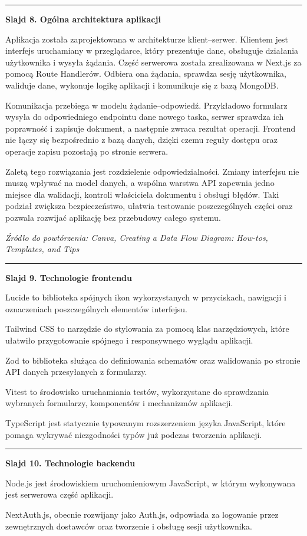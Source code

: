 \documentclass[12pt,a4paper]{article}
\newif\iffirstslide
\newcommand{\Slide}[2]{%
  \iffirstslide
    \global\firstslidefalse
  \else
    \par\vspace{1.5\baselineskip}%
    \noindent\rule{\textwidth}{0.8pt}%
    \par\vspace{1.5\baselineskip}%
  \fi
  {\LARGE\bfseries Slajd #1. #2\par}%
  \vspace{2\baselineskip}%
}
\newcommand{\Source}[1]{%
  \par\vspace{0.5\baselineskip}%
  {\small\itshape Źródło do powtórzenia: #1\par}%
}
\begin{document}
\Slide{8}{Ogólna architektura aplikacji}

Aplikacja została zaprojektowana w architekturze klient--serwer. Klientem jest interfejs uruchamiany w przeglądarce, który prezentuje dane, obsługuje działania użytkownika i wysyła żądania. Część serwerowa została zrealizowana w Next.js za pomocą Route Handlerów. Odbiera ona żądania, sprawdza sesję użytkownika, waliduje dane, wykonuje logikę aplikacji i komunikuje się z bazą MongoDB.

Komunikacja przebiega w modelu żądanie--odpowiedź. Przykładowo formularz wysyła do odpowiedniego endpointu dane nowego taska, serwer sprawdza ich poprawność i zapisuje dokument, a następnie zwraca rezultat operacji. Frontend nie łączy się bezpośrednio z bazą danych, dzięki czemu reguły dostępu oraz operacje zapisu pozostają po stronie serwera.

Zaletą tego rozwiązania jest rozdzielenie odpowiedzialności. Zmiany interfejsu nie muszą wpływać na model danych, a wspólna warstwa API zapewnia jedno miejsce dla walidacji, kontroli właściciela dokumentu i obsługi błędów. Taki podział zwiększa bezpieczeństwo, ułatwia testowanie poszczególnych części oraz pozwala rozwijać aplikację bez przebudowy całego systemu.

\Source{Canva, \emph{Creating a Data Flow Diagram: How-tos, Templates, and Tips}}

\Slide{9}{Technologie frontendu}

Lucide to biblioteka spójnych ikon wykorzystanych w przyciskach, nawigacji i oznaczeniach poszczególnych elementów interfejsu.

Tailwind CSS to narzędzie do stylowania za pomocą klas narzędziowych, które ułatwiło przygotowanie spójnego i responsywnego wyglądu aplikacji.

Zod to biblioteka służąca do definiowania schematów oraz walidowania po stronie API danych przesyłanych z formularzy.

Vitest to środowisko uruchamiania testów, wykorzystane do sprawdzania wybranych formularzy, komponentów i mechanizmów aplikacji.

TypeScript jest statycznie typowanym rozszerzeniem języka JavaScript, które pomaga wykrywać niezgodności typów już podczas tworzenia aplikacji.

\Slide{10}{Technologie backendu}

Node.js jest środowiskiem uruchomieniowym JavaScript, w którym wykonywana jest serwerowa część aplikacji.

NextAuth.js, obecnie rozwijany jako Auth.js, odpowiada za logowanie przez zewnętrznych dostawców oraz tworzenie i obsługę sesji użytkownika.
\end{document}
